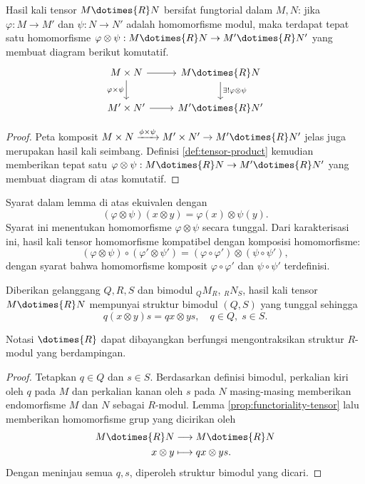 \begin{lemma}\label{prop:functoriality-tensor}
	Hasil kali tensor $M \dotimes{R} N$ bersifat fungtorial dalam $M, N$: jika $\varphi: M \to M'$ dan $\psi: N \to N'$ adalah homomorfisme modul, maka terdapat tepat satu homomorfisme $\varphi \otimes \psi: M \dotimes{R} N \to M' \dotimes{R} N'$ yang membuat diagram berikut komutatif.
	\[ \begin{tikzcd}
		M \times N \arrow[r] \arrow[d, "{\varphi \times \psi}"'] & M \dotimes{R} N \arrow[d, "{\exists! \varphi \otimes \psi}"] \\
		M' \times N' \arrow[r] & M' \dotimes{R} N'
	\end{tikzcd} \]
\end{lemma}
\begin{proof}
	Peta komposit $M \times N \xrightarrow{\phi \times \psi} M' \times N' \to M' \dotimes{R} N'$ jelas juga merupakan hasil kali seimbang. Definisi \ref{def:tensor-product} kemudian memberikan tepat satu $\varphi \otimes \psi: M \dotimes{R} N \to M' \dotimes{R} N'$ yang membuat diagram di atas komutatif.
\end{proof}
Syarat dalam lemma di atas ekuivalen dengan
\[ (\varphi \otimes \psi) (x \otimes y) = \varphi(x) \otimes \psi(y). \]
Syarat ini menentukan homomorfisme $\varphi \otimes \psi$ secara tunggal. Dari karakterisasi ini, hasil kali tensor homomorfisme kompatibel dengan komposisi homomorfisme:
\[ (\varphi \otimes \psi) \circ (\varphi' \otimes \psi') = (\varphi \circ \varphi') \otimes (\psi \circ \psi'), \]
dengan syarat bahwa homomorfisme komposit $\varphi \circ \varphi'$ dan $\psi \circ \psi'$ terdefinisi.

\begin{proposition}\label{prop:tensor-bimodule-structure}
	Diberikan gelanggang $Q, R, S$ dan bimodul ${}_Q M_R$, ${}_R N_S$, hasil kali tensor $M \dotimes{R} N$ mempunyai struktur bimodul $(Q, S)$ yang tunggal sehingga
	\[ q(x \otimes y)s = qx \otimes ys, \quad q \in Q, \; s \in S. \]
\end{proposition}
Notasi $\dotimes{R}$ dapat dibayangkan berfungsi mengontraksikan struktur $R$-modul yang berdampingan.
\begin{proof}
	Tetapkan $q \in Q$ dan $s \in S$. Berdasarkan definisi bimodul, perkalian kiri oleh $q$ pada $M$ dan perkalian kanan oleh $s$ pada $N$ masing-masing memberikan endomorfisme $M$ dan $N$ sebagai $R$-modul. Lemma \ref{prop:functoriality-tensor} lalu memberikan homomorfisme grup yang dicirikan oleh
	\begin{align*}
		M \dotimes{R} N & \longrightarrow M \dotimes{R} N \\
		x \otimes y & \longmapsto qx \otimes ys.
	\end{align*}
	Dengan meninjau semua $q, s$, diperoleh struktur bimodul yang dicari.
\end{proof}

